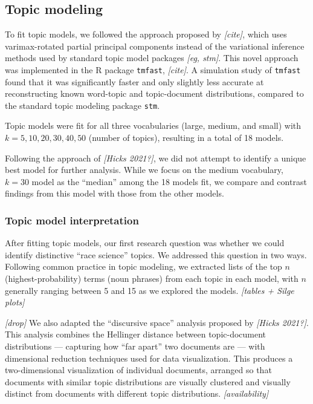 \documentclass[12pt]{article}
\begin{document}
\hypertarget{topic-modeling}{%
\subsection*{Topic modeling}\label{topic-modeling}}

To fit topic models, we followed the approach proposed by \emph{{[}cite{]}}, which uses varimax-rotated partial principal components instead of the variational inference methods used by standard topic model packages \emph{{[}eg, stm{]}}. This novel approach was implemented in the R package \texttt{tmfast}, \emph{{[}cite{]}}. A simulation study of \texttt{tmfast} found that it was significantly faster and only slightly less accurate at reconstructing known word-topic and topic-document distributions, compared to the standard topic modeling package \texttt{stm}.

Topic models were fit for all three vocabularies (large, medium, and small) with \(k = 5, 10, 20, 30, 40, 50\) (number of topics), resulting in a total of 18 models.

Following the approach of \emph{{[}Hicks 2021?{]}}, we did not attempt to identify a unique best model for further analysis. While we focus on the medium vocabulary, \(k=30\) model as the ``median'' among the 18 models fit, we compare and contrast findings from this model with those from the other models.

\hypertarget{topic-model-interpretation}{%
\subsubsection*{Topic model interpretation}\label{topic-model-interpretation}}

After fitting topic models, our first research question was whether we could identify distinctive ``race science'' topics. We addressed this question in two ways. Following common practice in topic modeling, we extracted lists of the top \(n\) (highest-probability) terms (noun phrases) from each topic in each model, with \(n\) generally ranging between 5 and 15 as we explored the models. \emph{{[}tables + Silge plots{]}}

\emph{{[}drop{]}}
We also adapted the ``discursive space'' analysis proposed by \emph{{[}Hicks 2021?{]}}. This analysis combines the Hellinger distance between topic-document distributions --- capturing how ``far apart'' two documents are --- with dimensional reduction techniques used for data visualization. This produces a two-dimensional visualization of individual documents, arranged so that documents with similar topic distributions are visually clustered and visually distinct from documents with different topic distributions. \emph{{[}availability{]}}
\end{document}
